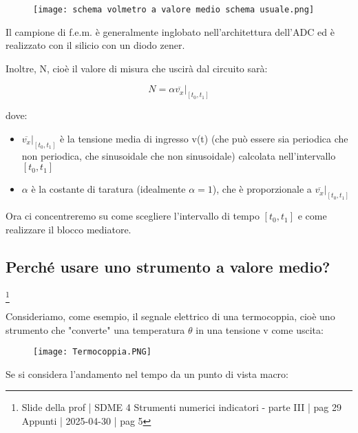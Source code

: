 \begin{figure}[h]
    \centering
    \texttt{[image: schema volmetro a valore medio schema usuale.png]}
\end{figure} 

Il campione di f.e.m. è generalmente inglobato nell'architettura dell'ADC ed è realizzato con il silicio con un diodo zener. \newline 

Inoltre, N, cioè il valore di misura che uscirà dal circuito sarà: 

{
    \Large 
    \begin{equation}
        N 
        = 
        \alpha 
        \left.
        \overline{v_x}
        \right|_{[t_0, t_1]}
    \end{equation}
}

dove: 

\begin{itemize}
    \item $\left. \overline{v_x} \right|_{[t_0, t_1]}$ è la tensione media di ingresso v(t) (che può essere sia periodica che non periodica, che sinusoidale che non sinusoidale) calcolata nell'intervallo $[t_0, t_1]$
    \item $\alpha$ è la costante di taratura (idealmente $\alpha = 1$), che è proporzionale a $\left. \overline{v_x} \right|_{[t_0, t_1]}$
\end{itemize}

Ora ci concentreremo su come scegliere l'intervallo di tempo $[t_0, t_1]$ e come realizzare il blocco mediatore. \newline 

\newpage 

\subsection{Perché usare uno strumento a valore medio?}
\footnote{Slide della prof | SDME 4 Strumenti numerici indicatori - parte III | pag  29 \\  
Appunti | 2025-04-30 | pag 5} 

Consideriamo, come esempio, il segnale elettrico di una termocoppia, cioè uno strumento che "converte" una temperatura $\theta$ 
in una tensione v come uscita: 

\begin{figure}[h]
    \centering
    \texttt{[image: Termocoppia.PNG]}
\end{figure} 

Se si considera l'andamento nel tempo da un punto di vista macro: 


